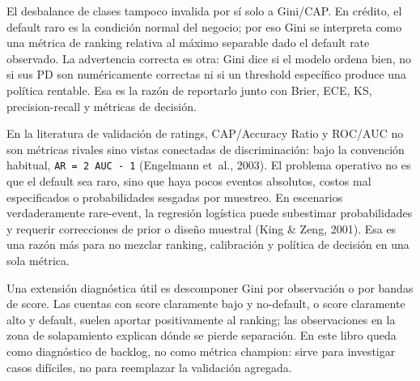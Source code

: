 \documentclass[
  spanish,
  11pt,
  letterpaper,
]{scrbook}
\theoremstyle{plain}
\theoremstyle{remark}
\begin{document}
\begin{tcolorbox}[enhanced jigsaw, arc=.35mm, bottomrule=.15mm, bottomtitle=1mm, breakable, colback=white, colbacktitle=quarto-callout-note-color!10!white, colframe=quarto-callout-note-color-frame, coltitle=black, left=2mm, leftrule=.75mm, opacityback=0, opacitybacktitle=0.6, rightrule=.15mm, title=\textcolor{quarto-callout-note-color}{\faInfo}\hspace{0.5em}{Gini y desbalance}, titlerule=0mm, toprule=.15mm, toptitle=1mm]

El desbalance de clases tampoco invalida por sí solo a Gini/CAP. En
crédito, el default raro es la condición normal del negocio; por eso
Gini se interpreta como una métrica de ranking relativa al máximo
separable dado el default rate observado. La advertencia correcta es
otra: Gini dice si el modelo ordena bien, no si sus PD son numéricamente
correctas ni si un threshold específico produce una política rentable.
Esa es la razón de reportarlo junto con Brier, ECE, KS, precision-recall
y métricas de decisión.

En la literatura de validación de ratings, CAP/Accuracy Ratio y ROC/AUC
no son métricas rivales sino vistas conectadas de discriminación: bajo
la convención habitual, \texttt{AR\ =\ 2\ AUC\ -\ 1} (Engelmann et~al.,
2003). El problema operativo no es que el default sea raro, sino que
haya pocos eventos absolutos, costos mal especificados o probabilidades
sesgadas por muestreo. En escenarios verdaderamente rare-event, la
regresión logística puede subestimar probabilidades y requerir
correcciones de prior o diseño muestral (King \& Zeng, 2001). Esa es una
razón más para no mezclar ranking, calibración y política de decisión en
una sola métrica.

Una extensión diagnóstica útil es descomponer Gini por observación o por
bandas de score. Las cuentas con score claramente bajo y no-default, o
score claramente alto y default, suelen aportar positivamente al
ranking; las observaciones en la zona de solapamiento explican dónde se
pierde separación. En este libro queda como diagnóstico de backlog, no
como métrica champion: sirve para investigar casos difíciles, no para
reemplazar la validación agregada.

\end{tcolorbox}
\end{document}
